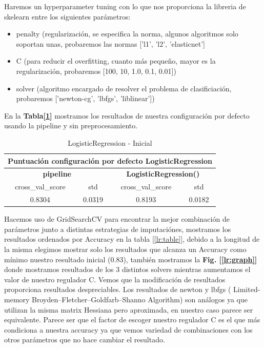 \documentclass[12pt,twoside]{report}
\begin{document}
Haremos un hyperparameter tuning con lo que nos proporciona la libreria de skelearn \cite{logistic-regression} entre los siguientes parámetros:
\begin{itemize}
	\item penalty (regularización, se especifica la norma, algunos algoritmos solo soportan unas, probaremos las normas ['l1', 'l2', 'elasticnet']
	\item C (para reducir el overfitting, cuanto más pequeño, mayor es la regularización, probaremos [100, 10, 1.0, 0.1, 0.01])
	\item solver (algoritmo encargado de resolver el problema de clasificiación, probaremos ['newton-cg', 'lbfgs', 'liblinear'])	
\end{itemize}


En la \textbf{Tabla[\ref{lr:inicial}]} mostramos los resultados de nuestra configuración por defecto usando la pipeline y sin preprocesamiento.

\begin{table}[h]
\begin{center}
  \begin{tabular}{|c|c|c|c|}
  \hline
    \multicolumn{4}{|c|}{\textbf{Puntuación configuración por defecto LogisticRegression}} \\  
     \hline
    \multicolumn{2}{|c|}{\textbf{pipeline}} & \multicolumn{2}{|c|}{\textbf{LogisticRegression()}}\\    
     \hline
   cross\_val\_score & std & cross\_val\_score & std  \\ 
    \hline
0.8304 & 0.0319 & 0.8193 & 0.0182  \\ 
\hline 
  \end{tabular}
  \end{center}
\caption{LogisticRegression - Inicial}
\label{lr:inicial}
\end{table}

Hacemos uso de GridSearchCV para encontrar la mejor combinación de parámetros junto a distintas estrategias de imputaciónes, mostramos los resultados ordenados por Accuracy en la tabla [\ref{lr:table}], debido a la longitud de la misma elegimos mostrar solo los resultados que alcanza un Accuracy como mínimo nuestro resultado inicial (0.83), también mostramos la \textbf{Fig. [\ref{lr:graph}]} donde mostramos resultados de los 3 distintos solvers mientras aumentamos el valor de nuestro regulador C. Vemos que la modificación de resultados proporciona resultados despreciables. Los resultados de newton y lbfgs ( Limited-memory Broyden–Fletcher–Goldfarb–Shanno Algorithm) son análogos ya que utilizan la misma matrix Hessiana pero aproximada, en nuestro caso parece ser equivalente. Parece ser que el factor de escoger nuestro regulador C es el que más condiciona a nuestra accuracy ya que vemos variedad de combinaciones con los otros parámetros que no hace cambiar el resultado.
\end{document}
